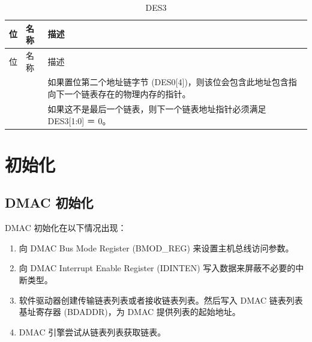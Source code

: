 \documentclass[main\_\_CN.tex]{subfiles}
\begin{document}
\begin{longtable}[c]{ |p{3cm}|p{4cm}|p{8cm}| }
\caption{DES3} \label{DES3}\\
\hline
{}
位 & 名称 & 描述 \\
\hline
\endfirsthead
\hline
{}
位 & 名称 & 描述 \\
\hline
\endhead
\endfoot
{}& & 如果置位第二个地址链字节 (DES0[4])，则该位会包含此地址包含指向下一个链表存在的物理内存的指针。\\
&&如果这不是最后一个链表，则下一个链表地址指针必须满足 DES3[1:0] ＝ 0。\\\hline
\end{longtable}

\section{初始化}
\subsection{DMAC 初始化}
DMAC 初始化在以下情况出现：
\begin{enumerate}
\item 向 DMAC Bus Mode Register (BMOD\_REG) 来设置主机总线访问参数。
\item 向 DMAC Interrupt Enable Register (IDINTEN) 写入数据来屏蔽不必要的中断类型。
\item 软件驱动器创建传输链表列表或者接收链表列表。然后写入 DMAC 链表列表基址寄存器 (BDADDR)，为 DMAC 提供列表的起始地址。
\item DMAC 引擎尝试从链表列表获取链表。
\end{enumerate}
\end{document}
